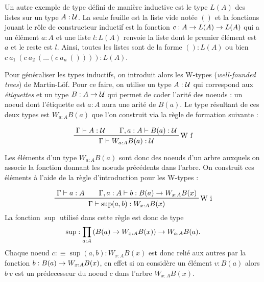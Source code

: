 \documentclass[../../rapport.tex]{subfiles}
\begin{document}
  Un autre exemple de type défini de manière inductive est le type $L(A)$ des listes sur un type $A : \mathcal U$.
  La seule feuille est la liste vide notée $()$ et la fonctions jouant le rôle de constructeur inductif est
  la fonction $c : A \rightarrow L(A) \rightarrow L(A)$ qui a un élément $a : A$ et une liste $l : L(A)$ renvoie la liste
  dont le premier élément est $a$ et le reste est $l$.
  Ainsi, toutes les listes sont de la forme $() : L(A)$ ou bien $c\ a_1\ (c\ a_2\ (\hdots (c\ a_n\ ()))) :L(A)$.

  \begin{figure}[ht]
    \centering
  \end{figure}

  Pour généraliser les types inductifs, on introduit alors les W-types (\textit{well-founded trees}) de Martin-Löf.
  Pour ce faire, on utilise un type $A : \mathcal U$ qui correspond aux \textit{étiquettes} et un type $B : A \rightarrow \mathcal U$ qui
  permet de coder l'arité des noeuds : un noeud dont l'étiquette est $a : A$ aura une arité de $B(a)$.
  Le type résultant de ces deux types est $W_{a:A} B(a)$ que l'on construit via la règle de formation suivante :

  $$
  \prfinterspace=2em
  \prftree[r]{W f}{\Gamma \vdash A : \U}{\Gamma, a : A \vdash B(a) : \U}{\Gamma \vdash W_{a: A} B(a) : \U}
  $$

  Les éléments d'un type $W_{a:A}B(a)$ sont donc des noeuds d'un arbre auxquels on associe la fonction donnant
  les noeuds précédents dans l'arbre. On construit ces éléments à l'aide
  de la règle d'introduction pour les W-types :

  $$
  \prfinterspace=2em
  \prftree[r]{W i}{\Gamma \vdash a : A}{\Gamma, a : A \vdash b : B(a) \fun W_{x:A}B(x)}
    {\Gamma \vdash \sup(a, b) : W_{x:A}B(x)}
  $$
  La fonction $\sup$ utilisé dans cette règle est donc de type
  $$\sup : \prod_{a:A}{\left(B(a) \rightarrow W_{x:A}B(x)\right)} \rightarrow W_{a:A}B(a).$$
  Chaque noeud $c :\equiv \sup(a, b) : W_{x:A}B(x)$ est donc relié aux autres par la fonction $b : B(a) \rightarrow W_{x:A}B(x)$,
  en effet si on considère un élément $v : B(a)$ alors $b\ v$ est un prédecesseur du noeud $c$ dans l'arbre $W_{x:A}B(x)$.
\end{document}

